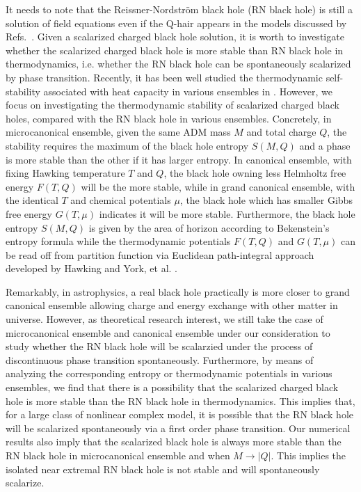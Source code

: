 \documentclass[pr, twocolumn, preprintnumbers, showpacs,footnoteadded, superscriptaddress,nofootinbib,longbibliography]{revtex4-1}
\begin{document}
It needs to note that the Reissner-Nordstr\"{o}m black hole (RN black hole) is still a solution of field equations even if the Q-hair appears in the models discussed by Refs.~\cite{Hong:2020miv,Hong:2019mcj}. Given a scalarized charged black hole solution, it is worth to investigate whether the scalarized charged black hole is more stable than RN black hole in thermodynamics, i.e. whether the RN black hole can be spontaneously scalarized by phase transition. Recently, it has been well studied the thermodynamic self-stability associated with heat capacity in various ensembles in \cite{Caldarelli:1999xj,Mo:2013sxa,Zhang:2018rlv,Quevedo:2006xk,Quevedo:2013pba}. However, we focus on  investigating the thermodynamic stability of scalarized charged black holes, compared with the RN black hole in various ensembles. Concretely, in microcanonical ensemble, given the same ADM mass $M$ and total charge $Q$, the stability requires the maximum of the black hole entropy $S(M,Q)$ and a phase is more stable than the other if it has larger entropy. In canonical ensemble, with fixing Hawking temperature $T$ and $Q$, the black hole owning less Helmholtz free energy $F(T,Q)$ will be the more stable, while in grand canonical ensemble, with the identical $T$ and chemical potentials $\mu$, the black hole which has smaller Gibbs free energy $G(T,\mu)$ indicates it will be more stable. Furthermore, the black hole entropy $S(M,Q)$ is given by the area of horizon according to Bekenstein's entropy formula while the thermodynamic potentials $F(T,Q)$ and $G(T, \mu)$ can be read off from partition function via Euclidean path-integral approach developed by Hawking and York, et al. \cite{Gibbons:1976ue,Brown:1989fa,Braden:1990hw}.

Remarkably, in astrophysics, a real black hole practically is more closer to grand canonical ensemble allowing charge and energy exchange with other matter in universe. However, as theoretical research interest, we still take the case of microcanonical ensemble and canonical ensemble under our consideration to study whether the RN black hole will be scalarzied under the process of discontinuous phase transition spontaneously.
Furthermore, by means of analyzing the corresponding entropy or thermodynamic potentials in various ensembles, we find that there is a possibility that the scalarized charged black hole is more stable than the RN black hole in thermodynamics. This implies that, for a large class of nonlinear complex model, it is possible that the RN black hole will be scalarized spontaneously via a first order phase transition. Our numerical results also imply that the scalarized black hole is always more stable than the RN black hole in microcanonical ensemble and when $M\rightarrow|Q|$. This implies the isolated near extremal RN black hole is not stable and will spontaneously scalarize.
\end{document}

